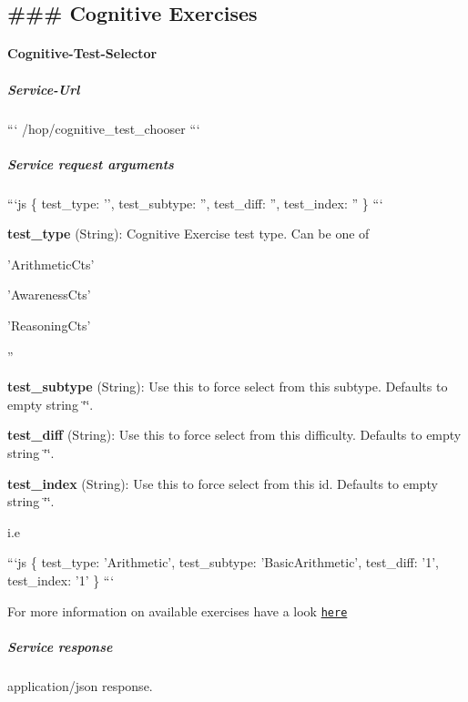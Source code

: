  \subsection*{\#\#\# Cognitive Exercises }

\paragraph*{Cognitive-\/\-Test-\/\-Selector}

\subparagraph*{Service-\/\-Url}

``` /hop/cognitive\-\_\-test\-\_\-chooser ```

\subparagraph*{Service request arguments}

```js \{ test\-\_\-type\-: '', test\-\_\-subtype\-: '', test\-\_\-diff\-: '', test\-\_\-index\-: '' \} ```


\begin{DoxyItemize}
\item {\bfseries test\-\_\-type} (String)\-: Cognitive Exercise test type. Can be one of
\begin{DoxyItemize}
\item 'Arithmetic\-Cts'
\item 'Awareness\-Cts'
\item 'Reasoning\-Cts'
\item ''
\end{DoxyItemize}
\item {\bfseries test\-\_\-subtype} (String)\-: Use this to force select from this subtype. Defaults to empty string \char`\"{}\char`\"{}.
\item {\bfseries test\-\_\-diff} (String)\-: Use this to force select from this difficulty. Defaults to empty string \char`\"{}\char`\"{}.
\item {\bfseries test\-\_\-index} (String)\-: Use this to force select from this id. Defaults to empty string \char`\"{}\char`\"{}.
\end{DoxyItemize}

i.\-e

```js \{ test\-\_\-type\-: 'Arithmetic', test\-\_\-subtype\-: 'Basic\-Arithmetic', test\-\_\-diff\-: '1', test\-\_\-index\-: '1' \} ```

For more information on available exercises have a look \href{https://github.com/rapp-project/rapp-platform/tree/master/rapp_cognitive_exercise}{\tt here}

\subparagraph*{Service response}

application/json response.

